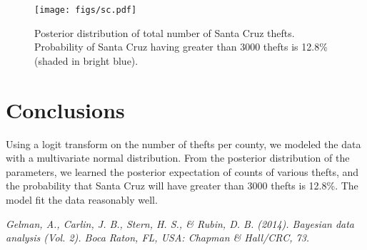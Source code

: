 \documentclass{../../tex_template/asaproc}
\begin{document}
\begin{figure}[H]
  \centering
  \texttt{[image: figs/sc.pdf]}
  \caption{Posterior distribution of total number of Santa Cruz thefts. Probability of Santa Cruz having greater than 3000 thefts is 12.8\% (shaded in bright blue).}
  \label{fig:scprob}
\end{figure}

\section{Conclusions}
Using a logit transform on the number of thefts per county, we modeled the data with a multivariate
normal distribution. From the posterior distribution of the parameters, we learned the posterior
expectation of counts of various thefts, and the probability that Santa Cruz will have greater than
3000 thefts is 12.8\%. The model fit the data reasonably well. 

\begin{references}
{\footnotesize
\itemsep=3pt

\item {\em Gelman, A., Carlin, J. B., Stern, H. S., \& Rubin, D. B. (2014). Bayesian data analysis (Vol. 2). Boca Raton, FL, USA: Chapman \& Hall/CRC, 73.}

}
\end{references}
\end{document}

